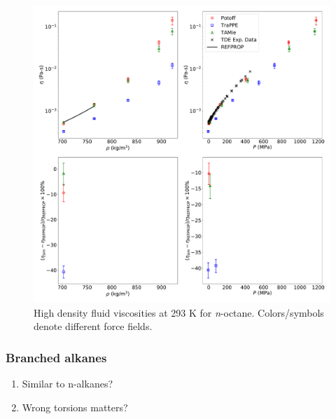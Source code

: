 \documentclass[preprint,review,12pt]{elsarticle}
\begin{document}
	\begin{figure}[p!]
		\centering
		\includegraphics[width=6.4in]{compare_REFPROP_T293highP_C8H18_all.pdf}
		\caption{High density fluid viscosities at 293 K for \textit{n}-octane. Colors/symbols denote different force fields.}
		\label{fig:T293highP_C8}
	\end{figure} 
	
	\subsubsection{Branched alkanes}
	
	\begin{enumerate}
		\item Similar to n-alkanes? 
		\item Wrong torsions matters?
	\end{enumerate}
	
	
\end{document}
